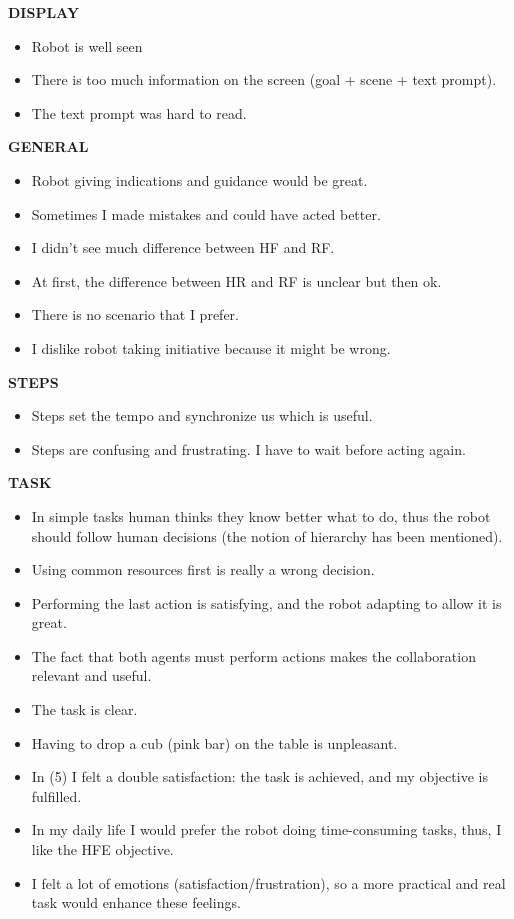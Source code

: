 \textbf{DISPLAY}
\begin{itemize}
\setlength\itemsep{-0.3em}
\item Robot is well seen
\item There is too much information on the screen (goal + scene + text prompt).
\item The text prompt was hard to read.
\end{itemize}

\textbf{GENERAL}
\begin{itemize}
\setlength\itemsep{-0.3em}
\item Robot giving indications and guidance would be great.
\item Sometimes I made mistakes and could have acted better.
\item I didn't see much difference between HF and RF.
\item At first, the difference between HR and RF is unclear but then ok.
\item There is no scenario that I prefer.
\item I dislike robot taking initiative because it might be wrong.
\end{itemize}

\textbf{STEPS}
\begin{itemize}
\setlength\itemsep{-0.3em}
\item Steps set the tempo and synchronize us which is useful.
\item Steps are confusing and frustrating. I have to wait before acting again.
\end{itemize}

\textbf{TASK}
\begin{itemize}
\setlength\itemsep{-0.3em}
\item In simple tasks human thinks they know better what to do, thus the robot should follow human decisions (the notion of hierarchy has been mentioned).
\item Using common resources first is really a wrong decision. 
\item Performing the last action is satisfying, and the robot adapting to allow it is great.
\item The fact that both agents must perform actions makes the collaboration relevant and useful. 
\item The task is clear.
\item Having to drop a cub (pink bar) on the table is unpleasant.
\item In (5) I felt a double satisfaction: the task is achieved, and my objective is fulfilled.
\item In my daily life I would prefer the robot doing time-consuming tasks, thus, I like the HFE objective.
\item I felt a lot of emotions (satisfaction/frustration), so a more practical and real task would enhance these feelings. 
\end{itemize}


